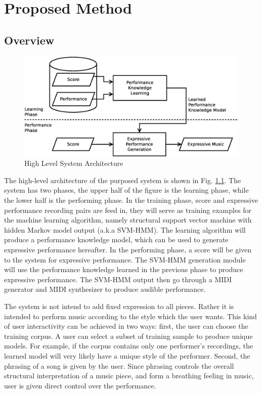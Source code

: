 \chapter{Proposed Method}
\label{chap:proposed}
\section{Overview}
      \begin{figure}[tp]
         \begin{center}
            \includegraphics[width=\textwidth]{fig/high_lev_arch}
         \end{center}
         \caption{High Level System Architecture} 
         \label{fig:flow}
      \end{figure}
The high-level architecture of the purposed system is shown in Fig. \ref{fig:flow}. The system has two phases, the upper half of the figure is the learning phase, while the lower half is the performing phase.  In the training phase, score and expressive performance recording pairs are feed in, they will serve as training examples for the machine learning algorithm, namely structural support vector machine with hidden Markov model output (a.k.a SVM-HMM). The learning algorithm will produce a performance knowledge model, which can be used to generate expressive performance hereafter. In the performing phase, a score will be given to the system for expressive performance. The SVM-HMM generation module will use the performance knowledge learned in the previous phase to produce expressive performance. The SVM-HMM output then go through a MIDI generator and MIDI synthesizer to produce audible performance.

The system is not intend to add fixed expression to all pieces. Rather it is intended to perform music according to the style which the user wants. This kind of user interactivity can be achieved in two ways: first, the user can choose the training corpus. A user can select a subset of training sample to produce unique models. For example, if the corpus contains only one performer's recordings, the learned model will very likely have a unique style of the performer. Second, the phrasing of a song is given by the user. Since phrasing controls the overall structural interpretation of a music piece, and form a breathing feeling in music, user is given direct control over the performance.

